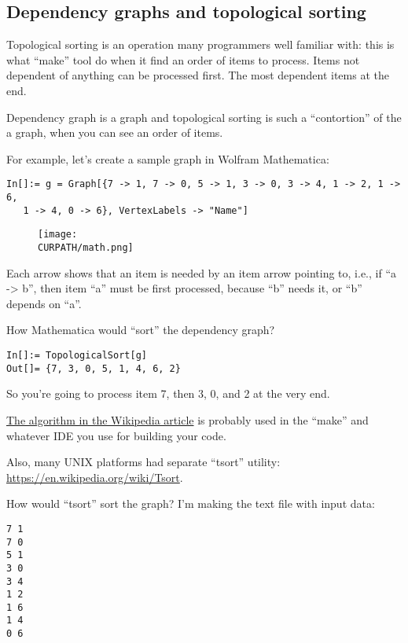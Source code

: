\subsection{Dependency graphs and topological sorting}

\renewcommand{\CURPATH}{other/tsort} 

Topological sorting is an operation many programmers well familiar with: this is what ``make'' tool
do when it find an order of items to process.
Items not dependent of anything can be processed first.
The most dependent items at the end.

Dependency graph is a graph and topological sorting is such a ``contortion'' of the a graph,
when you can see an order of items.

For example, let's create a sample graph in Wolfram Mathematica:

\begin{lstlisting}
In[]:= g = Graph[{7 -> 1, 7 -> 0, 5 -> 1, 3 -> 0, 3 -> 4, 1 -> 2, 1 -> 6, 
   1 -> 4, 0 -> 6}, VertexLabels -> "Name"]
\end{lstlisting}

\begin{figure}[H]
\centering
\texttt{[image: \\CURPATH/math.png]}
\caption{}
\end{figure}

Each arrow shows that an item is needed by an item arrow pointing to, i.e., if ``a -> b'', then item ``a'' must be first
processed, because ``b'' needs it, or ``b'' depends on ``a''.

How Mathematica would ``sort'' the dependency graph?

\begin{lstlisting}
In[]:= TopologicalSort[g]
Out[]= {7, 3, 0, 5, 1, 4, 6, 2}
\end{lstlisting}

So you're going to process item 7, then 3, 0, and 2 at the very end.

\href{https://en.wikipedia.org/wiki/Topological_sorting}{The algorithm in the Wikipedia article}
is probably used in the ``make'' and whatever IDE you use for building your code.

Also, many UNIX platforms had separate ``tsort'' utility:
\url{https://en.wikipedia.org/wiki/Tsort}.

How would ``tsort'' sort the graph? I'm making the text file with input data:

\begin{lstlisting}
7 1
7 0
5 1
3 0
3 4
1 2
1 6
1 4
0 6
\end{lstlisting}

